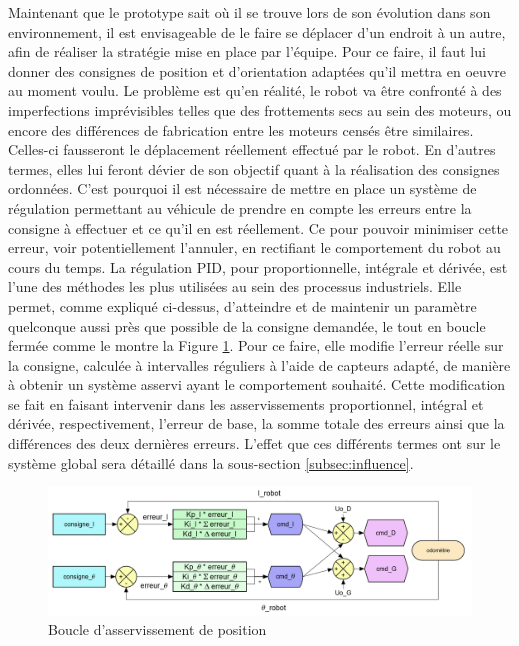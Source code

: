 \documentclass[a4paper,11pt]{article}
\begin{document}
Maintenant que le prototype sait où il se trouve lors de son évolution dans son environnement, il est envisageable de le faire se déplacer d'un endroit à un autre, afin de réaliser la stratégie mise en place par l'équipe. Pour ce faire, il faut lui donner des consignes de position et d'orientation adaptées qu'il mettra en oeuvre au moment voulu. Le problème est qu'en réalité, le robot va être confronté à des imperfections imprévisibles telles que des frottements secs au sein des moteurs, ou encore des différences de fabrication entre les moteurs censés être similaires. Celles-ci fausseront le déplacement réellement effectué par le robot. En d'autres termes, elles lui feront dévier de son objectif quant à la réalisation des consignes ordonnées. C'est pourquoi il est nécessaire de mettre en place un système de régulation permettant au véhicule de prendre en compte les erreurs entre la consigne à effectuer et ce qu'il en est réellement. Ce pour pouvoir minimiser cette erreur, voir potentiellement l'annuler, en rectifiant le comportement du robot au cours du temps. La régulation PID, pour proportionnelle, intégrale et dérivée, est l'une des méthodes les plus utilisées au sein des processus industriels.\cite{le_lann_pid_2007} Elle permet, comme expliqué ci-dessus, d'atteindre et de maintenir un paramètre quelconque aussi près que possible de la consigne demandée, le tout en boucle fermée comme le montre la Figure \ref{fig:boucle}. Pour ce faire, elle modifie l'erreur réelle sur la consigne, calculée à intervalles réguliers à l'aide de capteurs adapté, de manière à obtenir un système asservi ayant le comportement souhaité. Cette modification se fait en faisant intervenir dans les asservissements proportionnel, intégral et dérivée, respectivement, l'erreur de base, la somme totale des erreurs ainsi que la différences des deux dernières erreurs. L'effet que ces différents termes ont sur le système global sera détaillé dans la sous-section \ref{subsec:influence}.\\

\begin{figure}[H]
    \centering
    \includegraphics[scale = 0.55]{Capture.PNG}
    \caption{Boucle d'asservissement de position}
    \label{fig:boucle}
\end{figure}\\\\
\end{document}
